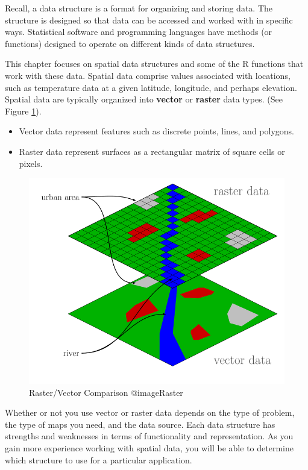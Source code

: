 \documentclass[]{krantz}
\providecommand{\tightlist}{%
  \setlength{\itemsep}{0pt}\setlength{\parskip}{0pt}}
\theoremstyle{definition}
\theoremstyle{definition}
\theoremstyle{definition}
\theoremstyle{remark}
\begin{document}
Recall, a data structure is a format for organizing and storing data.
The structure is designed so that data can be accessed and worked with
in specific ways. Statistical software and programming languages have
methods (or functions) designed to operate on different kinds of data
structures.

This chapter focuses on spatial data structures and some of the R
functions that work with these data. Spatial data comprise values
associated with locations, such as temperature data at a given latitude,
longitude, and perhaps elevation. Spatial data are typically organized
into \textbf{vector} or \textbf{raster} data types. (See Figure
\ref{fig:raster}).

\begin{itemize}
\tightlist
\item
  Vector data represent features such as discrete points, lines, and
  polygons.
\item
  Raster data represent surfaces as a rectangular matrix of square cells
  or pixels.
\end{itemize}

\begin{figure}

{\centering \includegraphics[width=1\linewidth]{08-spatialData/08-images/rasterVector} 

}

\caption{Raster/Vector Comparison @imageRaster}\label{fig:raster}
\end{figure}

Whether or not you use vector or raster data depends on the type of
problem, the type of maps you need, and the data source. Each data
structure has strengths and weaknesses in terms of functionality and
representation. As you gain more experience working with spatial data,
you will be able to determine which structure to use for a particular
application.
\end{document}

